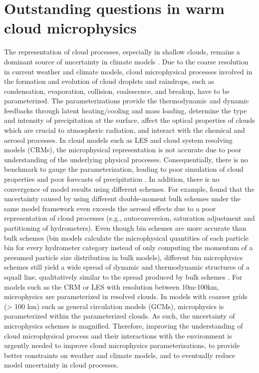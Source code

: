 \section{Outstanding questions in warm cloud microphysics}


The representation of cloud processes, especially in shallow clouds, remains a dominant source of uncertainty in climate models \citep[chapter 7]{ipcc2014}. Due to the coarse resolution in current weather and climate models, cloud microphysical processes involved in the formation and evolution of cloud droplets and raindrops, such as condensation, evaporation, collision, coalescence, and breakup, have to be parameterized. The parameterizations provide the thermodynamic and dynamic feedbacks through latent heating/cooling and mass loading, determine the type and intensity of precipitation at the surface, affect the optical properties of clouds which are crucial to atmospheric radiation, and interact with the chemical and aerosol processes. In cloud models such as LES and cloud system resolving models (CRMs), the microphysical representation is not accurate due to poor understanding of the underlying physical processes. Consequentially, there is no benchmark to gauge the parameterization, leading to poor simulation of cloud properties and poor forecasts of precipitation \citep{Fan2016}. In addition, there is no convergence of model results using different schemes. For example, \citet{White2017} found that the uncertainty caused by using different double-moment bulk schemes under the same model framework even exceeds the aerosol effects due to a poor representation of cloud processes (e.g., autoconversion, saturation adjustment and partitioning of hydrometers). Even though bin schemes are more accurate than bulk schemes (bin models calculate the microphysical quantities of each particle bin for every hydrometer category instead of only computing the momentum of a presumed particle size distribution in bulk models), different bin microphysics schemes still yield a wide spread of dynamic and thermodynamic structures of a squall line, qualitatively similar to the spread produced by bulk schemes \citep{Xue2017}. For models such as the CRM or LES with resolution between 10m-100km, microphysics are parameterized in resolved clouds. In models with coarser grids (> 100 km) such as general circulation models (GCMs), microphysics is parameterized within the parameterized clouds. As such, the uncertainty of microphysics schemes is magnified. Therefore, improving the understanding of cloud microphysical process and their interactions with the environment is urgently needed to improve cloud microphysics parameterizations, to provide better constraints on weather and climate models, and to eventually reduce model uncertainty in cloud processes. 

